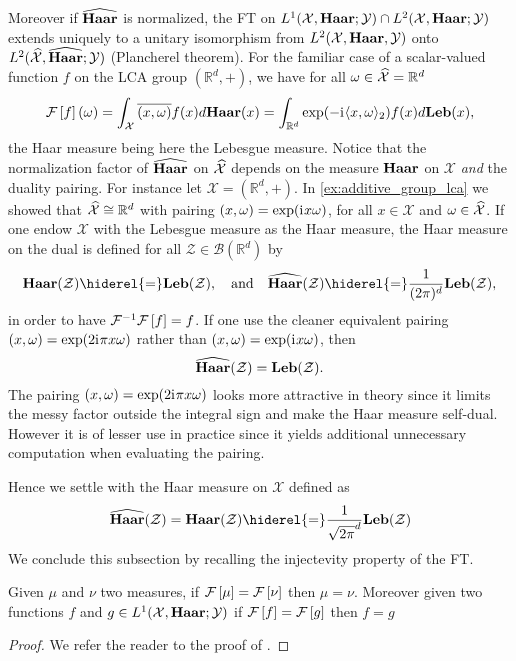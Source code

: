 \paragraph{}
Moreover if $\widehat{\mathbf{Haar}}$ is normalized, the \acl{FT} on $L^1(\mathcal{X},\mathbf{Haar};\mathcal{Y})\cap L^2(\mathcal{X},\mathbf{Haar};\mathcal{Y})$ extends uniquely to a unitary isomorphism from $L^2(\mathcal{X}, \mathbf{Haar}, \mathcal{Y})$ onto $L^2(\widehat{\mathcal{X}}, \widehat{\mathbf{Haar}}; \mathcal{Y})$ (Plancherel theorem). For the familiar case of a scalar-valued function $f$ on the \ac{LCA} group $(\mathbb{R}^d, +)$, we have for all $\omega\in \widehat{\mathcal{X}}=\mathbb{R}^d$
\begin{dmath}
\label{fourier-R-plus}
\FT{f}(\omega)
=\int_{\mathcal{X}} \conj{\pairing{x,\omega}}f(x)d\Haar(x)
=\int_{\mathbb{R}^d} \exp(-\iu \inner{x,\omega}_2)f(x) d\Leb(x),
\end{dmath}
the Haar measure being here the Lebesgue measure. Notice that the normalization factor of $\widehat{\mathbf{Haar}}$ on $\widehat{\mathcal{X}}$ depends on the measure $\mathbf{Haar}$ on $\mathcal{X}$ \emph{and} the duality pairing. For instance let $\mathcal{X}=(\mathbb{R}^d, +)$. In \cref{ex:additive_group_lca} we showed that $\widehat{\mathcal{X}}\cong\mathbb{R}^d$ with pairing $(x,\omega)=\exp({\mathrm{i}\mkern1mu} x\omega)$, for all $x\in\mathcal{X}$ and $\omega\in\widehat{\mathcal{X}}$.
If one endow $\mathcal{X}$ with the Lebesgue measure as the Haar measure, the Haar measure on the dual is defined for all $\mathcal{Z}\in\mathcal{B}(\mathbb{R}^d)$ by
\begin{dmath*}
\Haar(\mathcal{Z})\hiderel{=}\Leb(\mathcal{Z}),
\quad\text{and}\quad
\dual{\Haar}(\mathcal{Z})\hiderel{=}\frac{1}{(2\pi)^d}\Leb(\mathcal{Z}),
\end{dmath*}
in order to have $\mathcal{F}^{-1}\mathcal{F}\left[f\right]=f$. If one use the cleaner equivalent pairing $(x,\omega)=\exp(2{\mathrm{i}\mkern1mu}\pi x\omega)$ rather than $(x,\omega)=\exp({\mathrm{i}\mkern1mu} x\omega)$, then
\begin{dmath*}
\dual{\Haar}(\mathcal{Z})=\Leb(\mathcal{Z}).
\end{dmath*}
The pairing $(x,\omega)=\exp(2{\mathrm{i}\mkern1mu}\pi x\omega)$ looks more attractive in theory since it limits the messy factor outside the integral sign and make the Haar measure self-dual. However it is of lesser use in practice since it yields additional unnecessary computation when evaluating the pairing.

Hence we settle with the Haar measure on $\mathcal{X}$ defined as
\begin{dmath*}
\dual{\Haar}(\mathcal{Z})=\Haar(\mathcal{Z})\hiderel{=}\frac{1}{\sqrt{2\pi}^d}\Leb(\mathcal{Z})
\end{dmath*}
We conclude this subsection by recalling the injectevity property of the \acl{FT}.
\begin{corollary}
Given $\mu$ and $\nu$ two measures, if $\mathcal{F}\left[\mu\right]=\mathcal{F}\left[\nu\right]$ then $\mu=\nu$. Moreover given two functions $f$ and $g\in L^1(\mathcal{X},\mathbf{Haar};\mathcal{Y})$ if $\mathcal{F}\left[f\right]=\mathcal{F}\left[g\right]$ then $f=g$
\end{corollary}
\begin{proof}
We refer the reader to the proof of \citet[corollary~4.34 page~112]{folland1994course}.
\end{proof}

